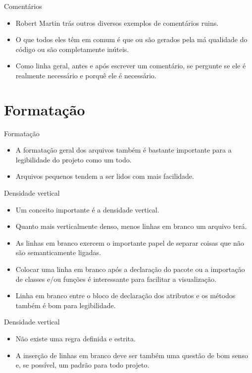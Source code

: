\documentclass[11pt]{beamer}
\begin{document}
  \begin{frame}{Comentários}
    \begin{itemize}
      \item Robert Martin trás outros diversos exemplos de comentários ruins.
      \item O que todos eles têm em comum é que ou são gerados pela má qualidade do código ou são completamente inúteis.
      \item Como linha geral, antes e após escrever um comentário, se pergunte se ele é realmente necessário e porquê ele é necessário.
    \end{itemize}
  \end{frame}

  \section{Formatação}

  \begin{frame}{Formatação}
    \begin{itemize}
      \item A formatação geral dos arquivos também é bastante importante para a legibilidade do projeto como um todo.
      \item Arquivos pequenos tendem a ser lidos com mais facilidade.
    \end{itemize}
  \end{frame}

  \begin{frame}{Densidade vertical}
    \begin{itemize}
      \item Um conceito importante é a densidade vertical.
      \item Quanto mais verticalmente denso, menos linhas em branco um arquivo terá.
      \item As linhas em branco exercem o importante papel de separar coisas que não são semanticamente ligadas.
      \item Colocar uma linha em branco após a declaração do pacote ou a importação de classes e/ou funções é interessante para facilitar a visualização.
      \item Linha em branco entre o bloco de declaração dos atributos e os métodos também é bom para legibilidade. 
    \end{itemize}
  \end{frame}

  \begin{frame}{Densidade vertical}
    \begin{itemize}
      \item Não existe uma regra definida e estrita.
      \item A inserção de linhas em branco deve ser também uma questão de bom senso e, se possível, um padrão para todo projeto.
    \end{itemize}
  \end{frame}
\end{document}
